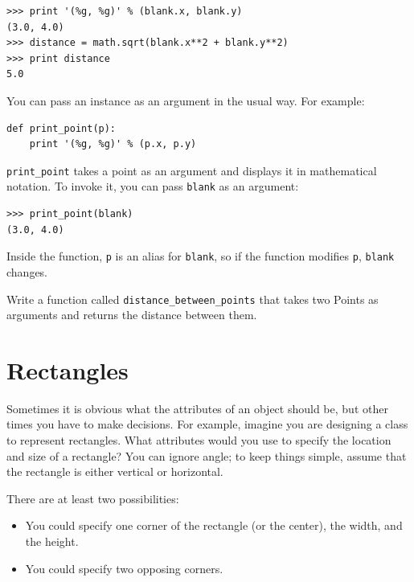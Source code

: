 \documentclass[10pt]{book}
\begin{document}
\begin{verbatim}
>>> print '(%g, %g)' % (blank.x, blank.y)
(3.0, 4.0)
>>> distance = math.sqrt(blank.x**2 + blank.y**2)
>>> print distance
5.0
\end{verbatim}
%
You can pass an instance as an argument in the usual way.
For example:

\begin{verbatim}
def print_point(p):
    print '(%g, %g)' % (p.x, p.y)
\end{verbatim}
%
\verb"print_point" takes a point as an argument and displays it in
mathematical notation.  To invoke it, you can pass {\tt blank} as
an argument:

\begin{verbatim}
>>> print_point(blank)
(3.0, 4.0)
\end{verbatim}
%
Inside the function, {\tt p} is an alias for {\tt blank}, so if
the function modifies {\tt p}, {\tt blank} changes.


\begin{exercise}

Write a function called \verb"distance_between_points" that takes two
Points as arguments and returns the distance between them.

\end{exercise}



\section{Rectangles}
\label{rectangles}

Sometimes it is obvious what the attributes of an object should be,
but other times you have to make decisions.  For example, imagine you
are designing a class to represent rectangles.  What attributes would
you use to specify the location and size of a rectangle?  You can
ignore angle; to keep things simple, assume that the rectangle is
either vertical or horizontal.

There are at least two possibilities: 

\begin{itemize}

\item You could specify one corner of the rectangle
(or the center), the width, and the height.

\item You could specify two opposing corners.

\end{itemize}
\end{document}
